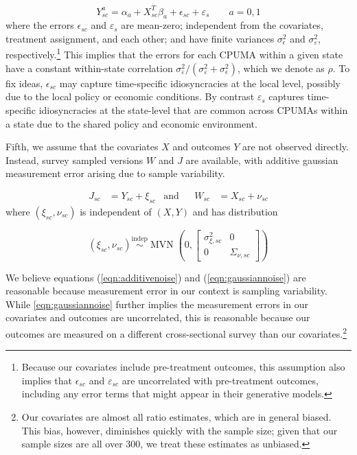 \documentclass[aoas]{imsart}
\theoremstyle{plain}
\theoremstyle{remark}
\begin{document}
\begin{equation}\label{eqn:linmod}
Y_{sc}^a = \alpha_a + X_{sc}^T\beta_a + \epsilon_{sc} + \varepsilon_s \qquad a = 0, 1
\end{equation}
%
where the errors $\epsilon_{sc}$ and $\varepsilon_{s}$ are mean-zero; independent from the covariates, treatment assignment, and each other; and have finite variances $\sigma^2_{\epsilon}$ and $\sigma^2_{\varepsilon}$, respectively.\footnote{Because our covariates include pre-treatment outcomes, this assumption also implies that $\epsilon_{sc}$ and $\varepsilon_{sc}$ are uncorrelated with pre-treatment outcomes, including any error terms that might appear in their generative models.} This implies that the errors for each CPUMA within a given state have a constant within-state correlation $\sigma^2_{\varepsilon}/(\sigma^2_{\varepsilon} + \sigma^2_{\epsilon})$, which we denote as $\rho$. To fix ideas, $\epsilon_{sc}$ may capture time-specific idiosyncracies at the local level, possibly due to the local policy or economic conditions. By contrast $\varepsilon_s$ captures time-specific idiosyncracies at the state-level that are common across CPUMAs within a state due to the shared policy and economic environment.

Fifth, we assume that the covariates $X$ and outcomes $Y$ are not observed directly. Instead, survey sampled versions $W$ and $J$ are available, with additive gaussian measurement error arising due to sample variability.

\begin{align} \label{eqn:additivenoise}
	J_{sc} & = Y_{sc} + \xi_{sc} & \text{and} & & W_{sc} & = X_{sc} + \nu_{sc}
\end{align}
where $(\xi_{sc}, \nu_{sc})$ is independent of $(X, Y)$ and has distribution

\begin{equation} \label{eqn:gaussiannoise}
 (\xi_{sc}, \nu_{sc}) \stackrel{\text{indep}}{\sim} \operatorname{MVN}\left(0, \left[\begin{array}{cc} \sigma_{\xi,sc}^2 & 0 \\ 0 & \Sigma_{\nu, sc} \end{array}\right] \right)
\end{equation}

We believe equations (\ref{eqn:additivenoise}) and (\ref{eqn:gaussiannoise}) are reasonable because measurement error in our context is sampling variability. While \eqref{eqn:gaussiannoise} further implies the measurement errors in our covariates and outcomes are uncorrelated, this is reasonable because our outcomes are measured on a different cross-sectional survey than our covariates.\footnote{Our covariates are almost all ratio estimates, which are in general biased. This bias, however, diminishes quickly with the sample size; given that our sample sizes are all over 300, we treat these estimates as unbiased.} 
\end{document}
